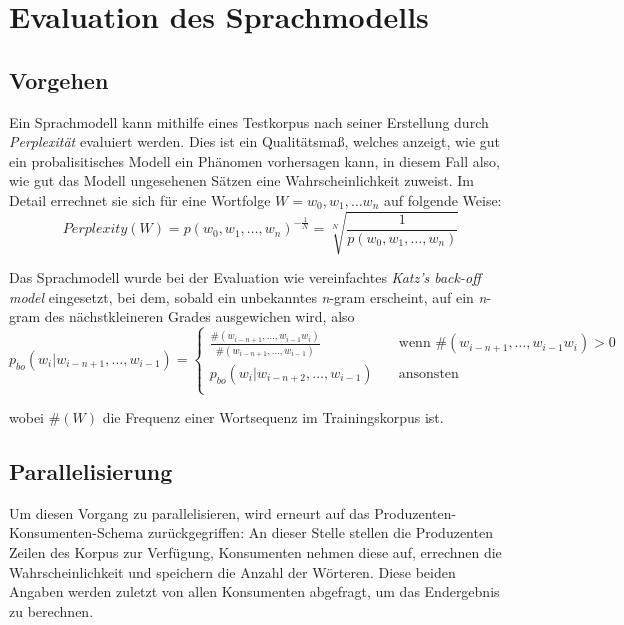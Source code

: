 \documentclass[a4paper,12pt]{scrartcl}
\begin{document}
\section{Evaluation des Sprachmodells} 

    \subsection{Vorgehen}

    Ein Sprachmodell kann mithilfe eines Testkorpus nach seiner Erstellung durch \emph{Perplexität} evaluiert werden. Dies ist ein Qualitätsmaß, welches anzeigt, wie gut ein probalisitisches Modell ein Phänomen vorhersagen kann, in diesem Fall also, wie gut das Modell ungesehenen Sätzen eine Wahrscheinlichkeit zuweist. Im Detail errechnet sie sich für eine Wortfolge $W = w_0, w_1, \ldots w_n$ auf folgende Weise:
    \[ Perplexity(W) = p(w_0, w_1, \ldots, w_n)^{-\frac{1}{N}} = \sqrt[N]{\frac{1}{p(w_0, w_1, \ldots, w_n)}}\]

    Das Sprachmodell wurde bei der Evaluation wie vereinfachtes \emph{Katz's back-off model} eingesetzt, bei dem, sobald ein unbekanntes \emph{n}-gram erscheint, auf ein \emph{n}-gram des nächstkleineren Grades ausgewichen wird, also 
    \[ p_{bo}(w_i|w_{i-n+1}, \ldots, w_{i-1}) = 
        \begin{cases}
            \frac{\#(w_{i-n+1}, \ldots, w_{i-1}w_i)}{\#(w_{i-n+1}, \ldots, w_{i-1})} & \quad \text{wenn } \#(w_{i-n+1}, \ldots, w_{i-1}w_i) > 0\\
            p_{bo}(w_i|w_{i-n+2}, \ldots, w_{i-1}) & \quad \text{ansonsten} \\
        \end{cases}
    \]

    wobei $\#(W)$ die Frequenz einer Wortsequenz im Trainingskorpus ist\cite{katz}.

    \subsection{Parallelisierung}

    Um diesen Vorgang zu parallelisieren, wird erneurt auf das Produzenten-Konsumenten-Schema zurückgegriffen: An dieser Stelle stellen die Produzenten Zeilen des Korpus zur Verfügung, Konsumenten nehmen diese auf, errechnen die Wahrscheinlichkeit und speichern die Anzahl der Wörteren. Diese beiden Angaben werden zuletzt von allen Konsumenten abgefragt, um das Endergebnis zu berechnen.
\end{document}

